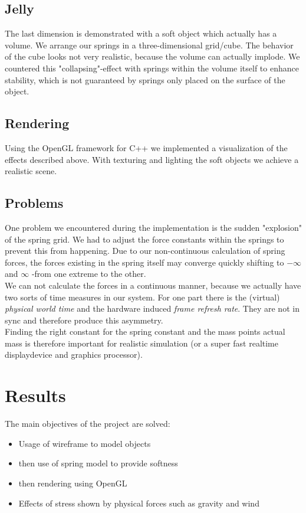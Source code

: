 \documentclass[11pt]{article}
\begin{document}
\subsection{Jelly}
The last dimension is demonstrated with a soft object which actually has a volume. We arrange our springs in a three-dimensional grid/cube. The behavior of the cube looks not very realistic, because the volume can actually implode. We countered this "collapsing"-effect with springs within the volume itself to enhance stability, which is not guaranteed by springs only placed on the surface of the object.
\subsection{Rendering}
Using the OpenGL framework for C++ we implemented a visualization of the effects described above. With texturing and lighting the soft objects we achieve a realistic scene.
\subsection{Problems}
One problem we encountered during the implementation is the sudden "explosion" of the spring grid. We had to adjust the force constants within the springs to prevent this from happening. Due to our non-continuous calculation of spring forces, the forces existing in the spring itself may converge quickly shifting to $-\infty$ and $\infty$ -from one extreme to the other.\\[1em]
We can not calculate the forces in a continuous manner, because we actually have two sorts of time measures in our system. For one part there is the (virtual) \textit{physical world time} and the hardware induced \textit{frame refresh rate}. They are not in sync and therefore produce this asymmetry.\\[1em]
Finding the right constant for the spring constant and the mass points actual mass is therefore important for realistic simulation (or a super fast realtime displaydevice and graphics processor).
%
\section{Results}
The main objectives of the project are solved:
\begin{itemize}
\item{Usage of wireframe to model objects}
\item{then use of spring model to provide softness}
\item{then rendering using OpenGL}
\item{Effects of stress shown by physical forces such as gravity and wind}
\end{itemize}
\end{document}
